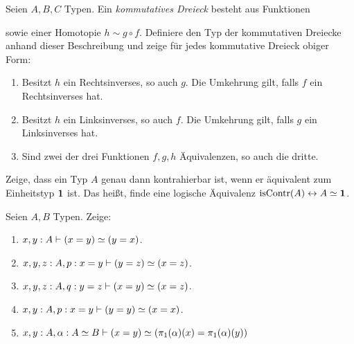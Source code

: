 \documentclass{uebung}
\begin{document}

\begin{exercise}
  Seien $A,B,C$ Typen.
  Ein \emph{kommutatives Dreieck} besteht aus Funktionen
  \begin{center}
  \end{center}
  sowie einer Homotopie $h\sim g\circ f$.
  Definiere den Typ der kommutativen Dreiecke anhand dieser Beschreibung und zeige für jedes kommutative Dreieck obiger Form:
  \begin{enumerate}
    \item Besitzt $h$ ein Rechtsinverses, so auch $g$.
      Die Umkehrung gilt, falls $f$ ein Rechtsinverses hat.
    \item Besitzt $h$ ein Linksinverses, so auch $f$.
      Die Umkehrung gilt, falls $g$ ein Linksinverses hat.
    \item Sind zwei der drei Funktionen $f,g,h$ Äquivalenzen, so auch die dritte.
  \end{enumerate}
\end{exercise}

\begin{exercise}
  Zeige, dass ein Typ $A$ genau dann kontrahierbar ist, wenn er äquivalent zum Einheitstyp $\mathbf{1}$ ist.
  Das heißt, finde eine logische Äquivalenz $\mathrm{isContr}(A)\leftrightarrow A\simeq\mathbf{1}$.
\end{exercise}

\begin{exercise}[Äquivalenzen I]
  Seien $A,B$ Typen.
  Zeige:
    \begin{enumerate}
      \item $x,y:A \vdash (x=y) \simeq (y=x)$.
      \item $x,y,z:A,p:x=y \vdash (y=z) \simeq (x=z)$.
      \item $x,y,z:A,q:y=z \vdash (x=y) \simeq (x=z)$.
      \item $x,y:A,p:x=y \vdash (y=y) \simeq (x=x)$.
      \item ${x,y:A, \alpha:A\simeq B \vdash (x=y) \simeq (\pi_1(\alpha)(x)=\pi_1(\alpha)(y))}$
    \end{enumerate}
\end{exercise}
\end{document}

